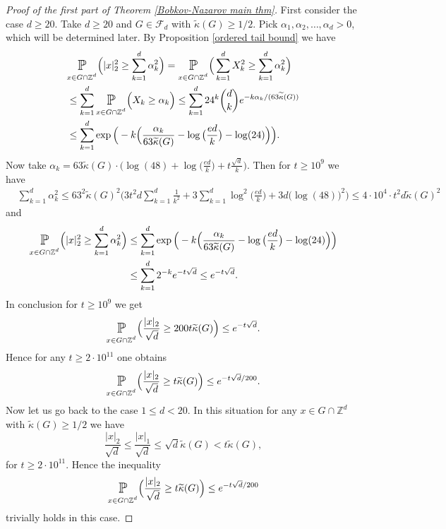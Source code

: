 \documentclass[10pt,a4paper]{amsart}
\numberwithin{equation}{section}
\newcommand{\Pro}{\mathop{\mathbb{P}}}
\newcommand{\Z}{\mathbb{Z}}
\newcommand{\spr}[1]{\underset{_{\substack{#1}}}{\mathlarger{\mathlarger{\Pro}}}}
\begin{document}
\begin{proof}[Proof of the first part of Theorem \ref{Bobkov-Nazarov main thm}]
First consider the case $d \ge 20$.
Take $d \ge 20$ and $G \in \mathcal{F}_d$ with $\widetilde{\kappa}(G) \ge 1/2$. Pick $\alpha_1,\alpha_2,\ldots, \alpha_d >0$, which will be determined later. By Proposition \ref{ordered tail bound} we have 
\begin{align*}
    &\spr{x \in G \cap \Z^d} \Big( |x|_2^2 \ge \sum_{k=1}^d \alpha_k^2 \Big)=\spr{x \in G \cap \Z^d} \Big(\sum_{k=1}^d X_k^2 \ge \sum_{k=1}^d \alpha_k^2 \Big) \\
    &\le \sum_{k=1}^d \spr{x \in G \cap \Z^d} \Big(  X_k \ge  \alpha_k \Big) \le \sum_{k=1}^d 24^k \binom{d}{k} e^{-k \alpha_k/(63\widetilde{\kappa}(G))} \\
    &\le \sum_{k=1}^d  \exp\Big(-k \Big(\frac{\alpha_k}{63\widetilde{\kappa}(G)}-\log\big( \frac{ed}{k}\big)- \log(24) \Big)\Big).
\end{align*}
Now take $\alpha_k=63\widetilde{\kappa}(G) \cdot \Big(\log(48)+ \log( \frac{ed}{k}\big)+t \frac{\sqrt{d}}{k}\Big)$. Then for $t \ge 10^{9}$ we have
\begin{align*}
    &\sum_{k=1}^d \alpha_k^2 \le 63^2\widetilde{\kappa}(G)^2 \bigg(3 t^2 d\sum_{k=1}^d \frac{1}{k^2}+3 \sum_{k=1}^d \log^2\big( \frac{ed}{k} \big)+ 3d\Big(  \log(48)\Big)^2 \bigg) \le 4 \cdot 10^4 \cdot t^2d \widetilde{\kappa}(G)^2
\end{align*}
and
\begin{align*}
   \spr{x \in G \cap \Z^d} \Big( |x|_2^2 \ge \sum_{k=1}^d \alpha_k^2 \Big) &\le \sum_{k=1}^d  \exp\Big(-k \Big(\frac{\alpha_k}{63\widetilde{\kappa}(G)}-\log\big( \frac{ed}{k}\big)- \log(24) \Big)\Big) \\
    &\le \sum_{k=1}^d 2^{-k} e^{-t \sqrt{d}} \le e^{-t \sqrt{d}}.
\end{align*}
 In conclusion for $t \ge 10^9$ we get
\begin{align*}
    \spr{x \in G \cap \Z^d} \Big(\frac{|x|_2}{\sqrt{d}} \ge 200 t \widetilde{\kappa}(G) \Big) \le  e^{-t \sqrt{d}} .
\end{align*}
Hence for any $t \ge 2\cdot10^{11}$ one obtains
\begin{align*}
    \spr{x \in G \cap \Z^d} \Big( \frac{|x|_2}{\sqrt{d}} \ge t \widetilde{\kappa}(G) \Big) \le e^{-t \sqrt{d}/200}.
\end{align*}
Now let us go back to the case $1 \le d <20$. 
In this situation for any $x \in G \cap \Z^d$ with $\widetilde{\kappa}(G) \ge 1/2$ we have
\[
\frac{|x|_2}{\sqrt{d}} \le \frac{|x|_1}{\sqrt{d}} \le \sqrt{d} \widetilde{\kappa}(G)<t \widetilde{\kappa}(G),
\]
for $t \ge 2 \cdot 10^{11}$. Hence the inequality
\begin{align*}
    \spr{x \in G \cap \Z^d} \Big( \frac{|x|_2}{\sqrt{d}} \ge t \widetilde{\kappa}(G) \Big) \le e^{-t \sqrt{d}/200}
\end{align*}
trivially holds in this case.
\end{proof}
\end{document}
